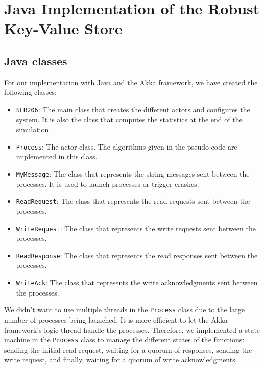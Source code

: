 \documentclass{article}
\begin{document}


\tableofcontents
\listoffigures

\newpage
\section{Java Implementation of the Robust Key-Value Store}

\subsection{Java classes}
For our implementation with Java and the Akka framework, we have created the following classes:

\begin{itemize}
    \item \texttt{SLR206}: The main class that creates the different actors and configures the system. It is also the class that computes the statistics at the end of the simulation.

    \item \texttt{Process}: The actor class. The algorithms given in the pseudo-code are implemented in this class.

    \item \texttt{MyMessage}: The class that represents the string messages sent between the processes. It is used to launch processes or trigger crashes.

    \item \texttt{ReadRequest}: The class that represents the read requests sent between the processes.

    \item \texttt{WriteRequest}: The class that represents the write requests sent between the processes.

    \item \texttt{ReadResponse}: The class that represents the read responses sent between the processes.

    \item \texttt{WriteAck}: The class that represents the write acknowledgments sent between the processes.
\end{itemize}

We didn't want to use multiple threads in the \texttt{Process} class due to the large number of processes
being launched. It is more efficient to let the Akka framework's logic thread handle the processes.
Therefore, we implemented a state machine in the \texttt{Process} class to manage the different states
of the functions: sending the initial read request, waiting for a quorum of responses, sending the
write request, and finally, waiting for a quorum of write acknowledgments.
\end{document}

